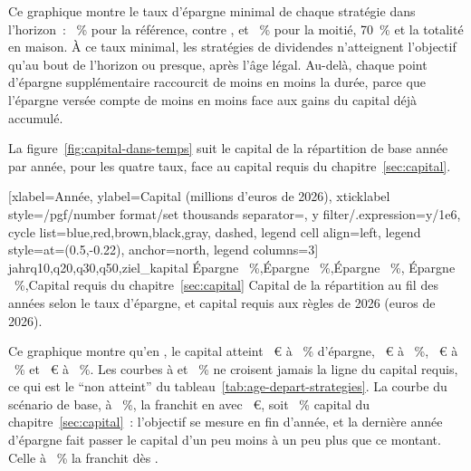 Ce graphique montre le taux d'\'epargne minimal de chaque strat\'egie dans l'horizon~:
\QuoteMinEtfReferenz~\% pour la r\'ef\'erence, contre \QuoteMinMaisonFuenfzig{}, \QuoteMinMaisonSiebzig{}
et \QuoteMinMaisonHundert~\% pour la moiti\'e, 70~\% et la totalit\'e en maison. \`A ce taux minimal,
les strat\'egies de dividendes n'atteignent l'objectif qu'au bout de l'horizon ou presque, apr\`es
l'\^age l\'egal. Au-del\`a, chaque point d'\'epargne
suppl\'ementaire raccourcit de moins en moins la dur\'ee, parce que l'\'epargne vers\'ee compte de moins
en moins face aux gains du capital d\'ej\`a accumul\'e.

La figure~\ref{fig:capital-dans-temps} suit le capital de la r\'epartition de base ann\'ee par ann\'ee,
pour les quatre taux, face au capital requis du chapitre~\ref{sec:capital}.

[xlabel={Ann\'ee}, ylabel={Capital (millions d'euros de 2026)},
  xticklabel style={/pgf/number format/set thousands separator={}},
  y filter/.expression={y/1e6}, cycle list={{blue},{red},{brown},{black},{gray, dashed}},
  legend cell align=left, legend style={at={(0.5,-0.22)}, anchor=north, legend columns=3}]%
  {jahr}{q10,q20,q30,q50,ziel_kapital}%
  {{\'Epargne \SparquoteZehn~\%},{\'Epargne \SparquoteZwanzig~\%},{\'Epargne \SparquoteDreissig~\%},
   {\'Epargne \SparquoteFuenfzig~\%},{Capital requis du chapitre~\ref{sec:capital}}}%
  {Capital de la r\'epartition \ReferenzStrategie{} au fil des ann\'ees selon le taux d'\'epargne, et capital
  requis aux r\`egles de 2026 (euros de 2026).\label{fig:capital-dans-temps}}

Ce graphique montre qu'en \AnneeHorizonFin, le capital atteint \KapitalHorizonZehn~€ \`a
\SparquoteZehn~\% d'\'epargne, \KapitalHorizonZwanzig~€ \`a \SparquoteZwanzig~\%,
\KapitalHorizonDreissig~€ \`a \SparquoteDreissig~\% et \KapitalHorizonFuenfzig~€ \`a
\SparquoteFuenfzig~\%. Les courbes \`a \SparquoteZehn{} et \SparquoteZwanzig~\% ne croisent jamais la
ligne du capital requis, ce qui est le \enquote{non atteint} du tableau~\ref{tab:age-depart-strategies}.
La courbe du sc\'enario de base, \`a \ReferenzSparquote~\%, la franchit en \AnneeYannBasis{} avec
\KapitalYannBasis~€, soit \KapitalYannEcartCibleProzent~\% \KapitalYannSensCible{} capital du
chapitre~\ref{sec:capital}~: l'objectif se mesure en fin d'ann\'ee, et la derni\`ere ann\'ee d'\'epargne
fait passer le capital d'un peu moins \`a un peu plus que ce montant. Celle \`a \SparquoteFuenfzig~\%
la franchit d\`es \AnneeCroisementFuenfzig.

